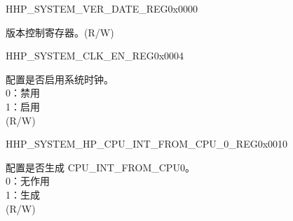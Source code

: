 \begin{register}{H}{HP\_SYSTEM\_VER\_DATE\_REG}{0x0000}\label{regdesc:HPSYSTEMVERDATEREG}
%
\regnewline%
\begin{regdesc}\begin{reglist}
\label{fielddesc:HPSYSTEMREGVERDATE}\item [HP\_SYSTEM\_REG\_VER\_DATE] 版本控制寄存器。(R/W)
\end{reglist}\end{regdesc}
\end{register}


\begin{register}{H}{HP\_SYSTEM\_CLK\_EN\_REG}{0x0004}\label{regdesc:HPSYSTEMCLKENREG}
%
%
\regnewline%
\begin{regdesc}\begin{reglist}
\label{fielddesc:HPSYSTEMCLKEN}\item [HP\_SYSTEM\_CLK\_EN] 配置是否启用系统时钟。\\
0：禁用\\
1：启用\\
(R/W)
\end{reglist}\end{regdesc}
\end{register}


\begin{register}{H}{HP\_SYSTEM\_HP\_CPU\_INT\_FROM\_CPU\_0\_REG}{0x0010}\label{regdesc:HPSYSTEMHPCPUINTFROMCPU0REG}
%
%
\regnewline%
\begin{regdesc}\begin{reglist}
\label{fielddesc:HPSYSTEMCPUINTFROMCPU0}\item [HP\_SYSTEM\_CPU\_INT\_FROM\_CPU\_0] 配置是否生成 CPU\_INT\_FROM\_CPU0。\\
0：无作用\\
1：生成\\
(R/W)
\end{reglist}\end{regdesc}
\end{register}


